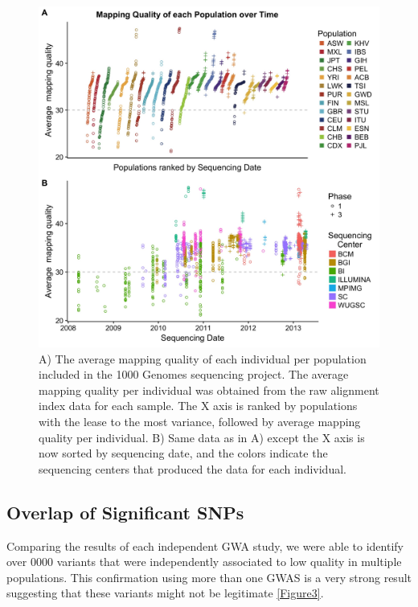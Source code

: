 \documentclass[12pt,twocolumn]{article}
\begin{document}
\begin{figure}
\includegraphics[width=\hsize,keepaspectratio]{MapQualOverTime.jpg}

\caption{A) The average mapping quality of each individual per population included in the 1000 Genomes sequencing project. The average mapping quality per individual was obtained from the raw alignment index data for each sample. The X axis is ranked by populations with the lease to the most variance, followed by average mapping quality per individual. B) Same data as in A) except the X axis is now sorted by sequencing date, and the colors indicate the sequencing centers that produced the data for each individual.}
\label{Figure1}
\end{figure}

	\subsection{Overlap of Significant SNPs}
Comparing the results of each independent GWA study, we were able to identify over 0000 variants that were independently associated to low quality in multiple populations. This confirmation using more than one GWAS is a very strong result suggesting that these variants might not be legitimate  \ref{Figure3}. 
\end{document}
